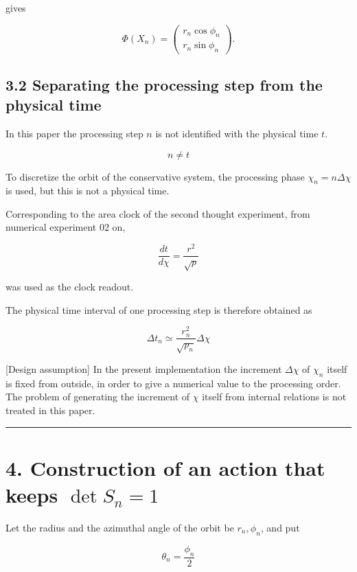 \documentclass[
  a4paper,
]{article}
\begin{document}
gives

\[
\Phi(X_n)
=
\begin{pmatrix}
r_n\cos\phi_n\\
r_n\sin\phi_n
\end{pmatrix}.
\]

\subsection{3.2 Separating the processing step from the physical
time}\label{separating-the-processing-step-from-the-physical-time}

In this paper the processing step \(n\) is not identified with the
physical time \(t\).

\[
\boxed{n\neq t}
\]

To discretize the orbit of the conservative system, the processing phase
\(\chi_n=n\Delta\chi\) is used, but this is not a physical time.

Corresponding to the area clock of the second thought experiment, from
numerical experiment 02 on,

\[
\frac{dt}{d\chi}=\frac{r^2}{\sqrt p}
\]

was used as the clock readout.

The physical time interval of one processing step is therefore obtained
as

\[
\Delta t_n
\simeq
\frac{r_n^2}{\sqrt{p_n}}\Delta\chi
\]

{[}Design assumption{]} In the present implementation the increment
\(\Delta\chi\) of \(\chi_n\) itself is fixed from outside, in order to
give a numerical value to the processing order. The problem of
generating the increment of \(\chi\) itself from internal relations is
not treated in this paper.

\begin{center}\rule{0.5\linewidth}{0.5pt}\end{center}

\section{\texorpdfstring{4. Construction of an action that keeps
\(\det S_n=1\)}{4. Construction of an action that keeps \textbackslash det S\_n=1}}\label{construction-of-an-action-that-keeps-det-s_n1}

Let the radius and the azimuthal angle of the orbit be \(r_n,\phi_n\),
and put

\[
\theta_n=\frac{\phi_n}{2}
\]
\end{document}
